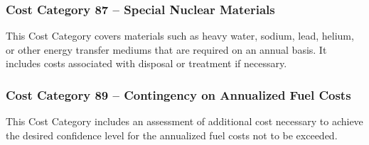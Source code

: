 \subsubsection*{Cost Category 87 – Special Nuclear Materials}
This Cost Category covers materials such as heavy water, sodium, lead, helium, or other energy transfer mediums that are required on an annual basis. It includes costs associated with disposal or treatment if necessary. 

\subsubsection*{Cost Category 89 – Contingency on Annualized Fuel Costs}
This Cost Category includes an assessment of additional cost necessary to achieve the desired confidence level for the annualized fuel costs not to be exceeded.
